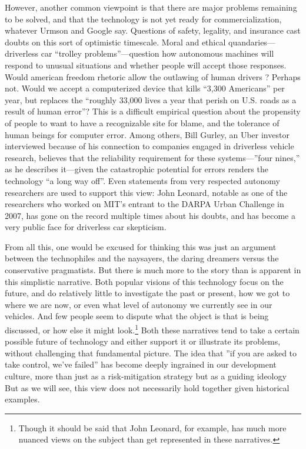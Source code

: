 However, another common viewpoint is that there are major problems remaining to be
solved, and that the technology is not yet ready for
commercialization, whatever Urmson and Google 
say. Questions of safety, legality, and insurance cast doubts on this
sort of optimistic timescale. Moral and ethical
quandaries---driverless car ``trolley problems''---question how
autonomous machines will respond to unusual situations and whether
people will accept those responses. Would american freedom rhetoric
allow the outlawing of human drivers \cite{???-http://www.washingtonpost.com/blogs/wonkblog/wp/2015/03/18/should-we-outlaw-human-drivers-in-a-world-of-driverless-cars/}? 
Perhaps not. Would we accept a computerized device that kills ``3,300
Americans'' per year, but replaces the ``roughly 33,000 lives a year
that perish on U.S. roads as a result of human
error''\cite{???-http://www.washingtonpost.com/blogs/innovations/wp/2015/03/16/driverless-cars-a-tremendous-innovation-with-a-glaring-achilles-heel/}?
This is a difficult empirical question about the propensity of people
to want to have a recognizable site for blame, and the tolerance of
human beings for computer error. Among others, Bill Gurley, an Uber
investor interviewed because of his connection to companies engaged in
driverless vehicle research, believes that the reliability requirement
for these systems---''four nines,'' as he describes it---given the
catastrophic potential for errors renders the technology ``a long way
off''\cite{???--http://www.businessinsider.com/bill-gurley-is-skeptical-of-driverless-cars-2015-3}.
Even statements from very respected autonomy researchers are used to
support this view: John Leonard, notable as one of the researchers who
worked on MIT's entrant to the DARPA Urban Challenge in 2007, has gone
on the record multiple times about his doubts, and has become a very
public face for driverless car skepticism\cite{???-gomes}.

From all this, one would be excused for thinking this was just an
argument between the technophiles and the naysayers, the daring dreamers versus the
conservative pragmatists. But there is much more to the story than is
apparent in this simplistic narrative. Both popular visions of this
technology focus on the future, and do relatively little to
investigate the past or present, how we got to 
where we are now, or even what level of autonomy we currently see in
our vehicles. And few people seem to dispute what the object is that is
being discussed, or how else it might look.\footnote{Though it should
  be said that John Leonard, for example, has much more nuanced views
  on the subject than get represented in these narratives.} Both these narratives 
tend to take a certain possible future of technology and either support it
or illustrate its problems, without challenging that fundamental
picture. The idea that ''if you are asked to take control, we've
failed'' has become deeply ingrained in our development
culture, more than just as a risk-mitigation strategy but as a guiding
ideology But as we will see, this view does not necessarily hold together given
historical examples.


